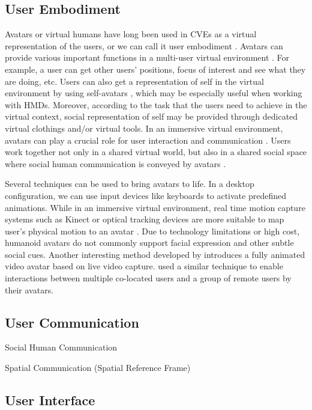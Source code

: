 \subsection{User Embodiment}
Avatars or virtual humans have long been used in CVEs as a virtual representation of the users, or we can call it user embodiment \citep{Benford1995UEC}. Avatars can provide various important functions in a multi-user virtual environment \citep{Thalmann2001VHR}. For example, a user can get other users' positions, focus of interest and see what they are doing, etc. Users can also get a representation of self in the virtual environment by using self-avatars \citep{Lok2003Effects}, which may be especially useful when working with HMDs. Moreover, according to the task that the users need to achieve in the virtual context, social representation of self may be provided through dedicated virtual clothings and/or virtual tools. In an immersive virtual environment, avatars can play a crucial role for user interaction and communication \citep{Slater1994Body}. Users work together not only in a shared virtual world, but also in a shared social space where social human communication is conveyed by avatars \citep{Roberts2004SSH}.

Several techniques can be used to bring avatars to life. In a desktop configuration, we can use input devices like keyboards to activate predefined animations. While in an immersive virtual environment, real time motion capture systems such as Kinect or optical tracking devices are more suitable to map user's physical motion to an avatar \citep{Mohler2010Effect, Vera2011AugMir, Normand2012FBA}. Due to technology limitations or high cost, humanoid avatars do not commonly support facial expression and other subtle social cues. Another interesting method developed by \citet{Ogi2001SteAva} introduces a fully animated video avatar based on live video capture. \citet{Beck2013IGG} used a similar technique to enable interactions between multiple co-located users and a group of remote users by their avatars.

\subsection{User Communication}
Social Human Communication

Spatial Communication (Spatial Reference Frame)

\subsection{User Interface}
